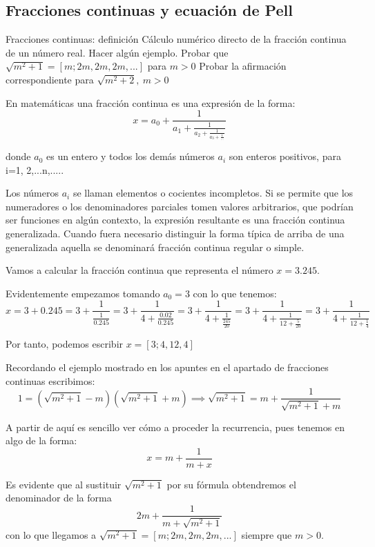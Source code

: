 \subsection{Fracciones continuas y ecuación de Pell}
\begin{problem}[27]
\ppart Fracciones continuas: definición
\ppart Cálculo numérico directo de la fracción continua de un número real. Hacer algún ejemplo.
\ppart Probar que $\sqrt{m^2+1}=[m;2m,2m,2m,...]$ para $m>0$
\ppart Probar la afirmación correspondiente para $\sqrt{m^2+2},\ m>0$
\solution


\spart

\begin{defn}
En matemáticas una fracción continua es una expresión de la forma:
\[x=a_0+\frac{1}{a_1+\frac{1}{a_2+\frac{1}{a_3+\frac{1}{...}}}}\]

donde $a_0$ es un entero y todos los demás números $a_i$ son enteros positivos, para i=1, 2,...n,.....

Los números $a_i$ se llaman elementos o cocientes incompletos. Si se permite que los numeradores o los denominadores parciales tomen valores arbitrarios, que podrían ser funciones en algún contexto, la expresión resultante es una fracción continua generalizada. Cuando fuera necesario distinguir la forma típica de arriba de una generalizada aquella se denominará fracción continua regular o simple.
\end{defn}

\spart

Vamos a calcular la fracción continua que representa el número $x=3.245$.

Evidentemente empezamos tomando $a_0=3$ con lo que tenemos:
\[x=3+0.245=3+\frac{1}{\frac{1}{0.245}} = 3+\frac{1}{4+\frac{0.02}{0.245}} = 3 +\frac{1}{4+\frac{1}{\frac{245}{20}}} = 3+\frac{1}{4+\frac{1}{12+\frac{5}{20}}}= 3+\frac{1}{4+\frac{1}{12+\frac{1}{4}}}\]

Por tanto, podemos escribir $x=[3; 4, 12, 4]$

\spart

Recordando el ejemplo mostrado en los apuntes en el apartado de fracciones continuas escribimos:
\[1= (\sqrt{m^2+1}-m)(\sqrt{m^2+1}+m) \implies \sqrt{m^2+1} = m+\frac{1}{\sqrt{m^2+1}+m}\]

A partir de aquí es sencillo ver cómo a proceder la recurrencia, pues tenemos en algo de la forma:
\[x=m+\frac{1}{m+x}\]

Es evidente que al sustituir $\sqrt{m^2+1}$ por su fórmula obtendremos el denominador de la forma
\[2m+\frac{1}{m+\sqrt{m^2+1}}\]
con lo que llegamos a $\sqrt{m^2+1}=[m;2m,2m,2m,...]$ siempre que $m>0$.


\end{problem}

